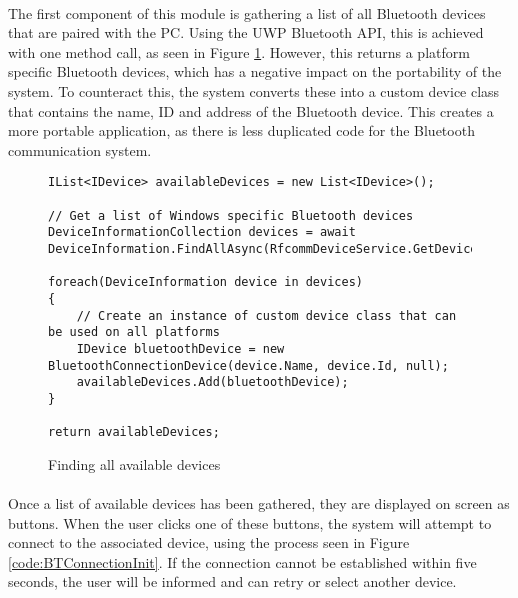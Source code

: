 {		\paragraph{}{
		The first component of this module is gathering a list of all Bluetooth devices that are paired	with the PC. Using the UWP Bluetooth API, this is achieved with one method call, as seen in Figure  \ref{code:AvailableDevices}. However, this returns a platform specific Bluetooth devices, which has a negative impact on the portability of the system. To counteract this, the system converts these into a custom device class that contains the name, ID and address of the Bluetooth device. This creates a more portable application, as there is less duplicated code for the Bluetooth communication system.
		}
		}
		
		\begin{figure}[h]
			\begin{lstlisting}
IList<IDevice> availableDevices = new List<IDevice>();

// Get a list of Windows specific Bluetooth devices
DeviceInformationCollection devices = await DeviceInformation.FindAllAsync(RfcommDeviceService.GetDeviceSelector(RfcommServiceId.SerialPort));

foreach(DeviceInformation device in devices)
{
	// Create an instance of custom device class that can be used on all platforms
	IDevice bluetoothDevice = new BluetoothConnectionDevice(device.Name, device.Id, null);
    availableDevices.Add(bluetoothDevice);
}

return availableDevices;
			\end{lstlisting}
			\caption{Finding all available devices}
			\label{code:AvailableDevices}
		\end{figure}
		
		\paragraph{}{
		Once a list of available devices has been gathered, they are displayed on screen as buttons. When the user clicks one of these buttons, the system will attempt to connect to the associated device, using the process seen in Figure \ref{code:BTConnectionInit}. If the connection cannot be established within five seconds, the user will be informed and can retry or select another device.
		}				
		
